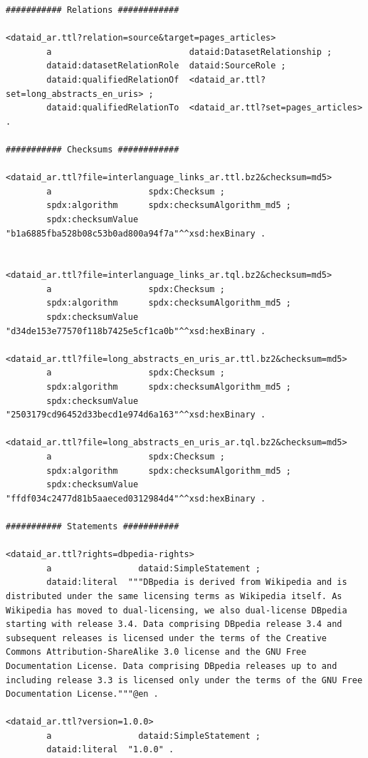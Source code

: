 \documentclass[a4paper,english,twoside,BCOR1.5cm,headsepline,DIV12,appendixprefix,final,12pt]{scrbook}
\begin{document}
\begin{lstlisting}[language=ttl, captionpos=b, label=lst:dcex,linewidth=\columnwidth,breaklines=true,basicstyle=\ttfamily\scriptsize]
########### Relations ############

<dataid_ar.ttl?relation=source&target=pages_articles>
        a                           dataid:DatasetRelationship ;
        dataid:datasetRelationRole  dataid:SourceRole ;
        dataid:qualifiedRelationOf  <dataid_ar.ttl?set=long_abstracts_en_uris> ;
        dataid:qualifiedRelationTo  <dataid_ar.ttl?set=pages_articles> .

########### Checksums ############

<dataid_ar.ttl?file=interlanguage_links_ar.ttl.bz2&checksum=md5>
        a                   spdx:Checksum ;
        spdx:algorithm      spdx:checksumAlgorithm_md5 ;
        spdx:checksumValue  "b1a6885fba528b08c53b0ad800a94f7a"^^xsd:hexBinary .


<dataid_ar.ttl?file=interlanguage_links_ar.tql.bz2&checksum=md5>
        a                   spdx:Checksum ;
        spdx:algorithm      spdx:checksumAlgorithm_md5 ;
        spdx:checksumValue  "d34de153e77570f118b7425e5cf1ca0b"^^xsd:hexBinary .

<dataid_ar.ttl?file=long_abstracts_en_uris_ar.ttl.bz2&checksum=md5>
        a                   spdx:Checksum ;
        spdx:algorithm      spdx:checksumAlgorithm_md5 ;
        spdx:checksumValue  "2503179cd96452d33becd1e974d6a163"^^xsd:hexBinary .

<dataid_ar.ttl?file=long_abstracts_en_uris_ar.tql.bz2&checksum=md5>
        a                   spdx:Checksum ;
        spdx:algorithm      spdx:checksumAlgorithm_md5 ;
        spdx:checksumValue  "ffdf034c2477d81b5aaeced0312984d4"^^xsd:hexBinary .
        
########### Statements ###########

<dataid_ar.ttl?rights=dbpedia-rights>
        a                 dataid:SimpleStatement ;
        dataid:literal  """DBpedia is derived from Wikipedia and is distributed under the same licensing terms as Wikipedia itself. As Wikipedia has moved to dual-licensing, we also dual-license DBpedia starting with release 3.4. Data comprising DBpedia release 3.4 and subsequent releases is licensed under the terms of the Creative Commons Attribution-ShareAlike 3.0 license and the GNU Free Documentation License. Data comprising DBpedia releases up to and including release 3.3 is licensed only under the terms of the GNU Free Documentation License."""@en .

<dataid_ar.ttl?version=1.0.0>
        a                 dataid:SimpleStatement ;
        dataid:literal  "1.0.0" .


\end{lstlisting}
\end{document}
